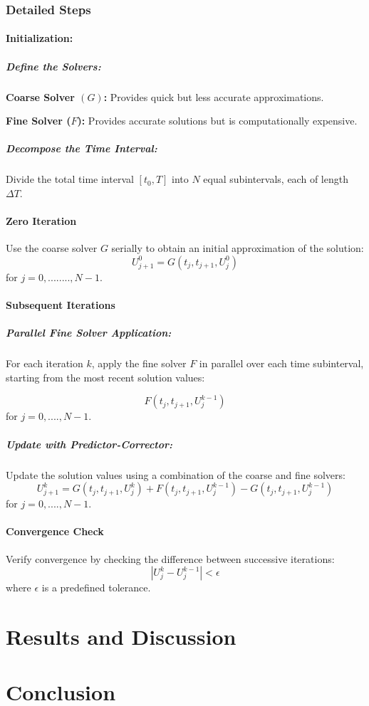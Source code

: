\documentclass{article}
\begin{document}
   \subsubsection{Detailed Steps}
   
   \paragraph{Initialization:} 
     \subparagraph{Define the Solvers:}
     
     
        \textbf{Coarse Solver $(G)$:} Provides quick but less accurate approximations.
        
        \textbf{Fine Solver ($F$):} Provides accurate solutions but is computationally expensive.
        
     \subparagraph{Decompose the Time Interval:}
      Divide the total time interval 
   $[t_0,T]$ into
   $N$ equal subintervals, each of length 
   $\Delta T$. 
   \paragraph{Zero Iteration}
   Use the coarse solver $G$ serially to obtain an initial approximation of the solution:
    $$ U_{j+1}^0 = G(t_j,t_{j+1}, U_j^0)$$   for $j = 0, ........, N-1$.
   \paragraph{Subsequent Iterations} 
       \subparagraph{Parallel Fine Solver Application:} 
           For each iteration $k$, apply the fine solver $F$ in parallel over each time subinterval, starting from the most recent solution values:
   
   $$ F(t_j,t_{j+1}, U_j^{k-1})$$ for $j = 0, ....,N-1$.
        \subparagraph{Update with Predictor-Corrector:}
        Update the solution values using a combination of the coarse and fine solvers:
        $$ U_{j+1}^k = G(t_j,t_{j+1},U_j^k) + F(t_j,t_{j+1},U_j^{k-1}) -G(t_j,t_{j+1},U_j^{k-1})$$
        for $j = 0, .... ,N-1$.
        
    \paragraph{Convergence Check}
        Verify convergence by checking the difference between successive iterations:
      $$   | U_j^k - U_j^{k-1} | < \epsilon $$
   where $ \epsilon $ is a predefined tolerance. \cite{para}

\section{Results and Discussion}


\section{Conclusion}



\end{document}
